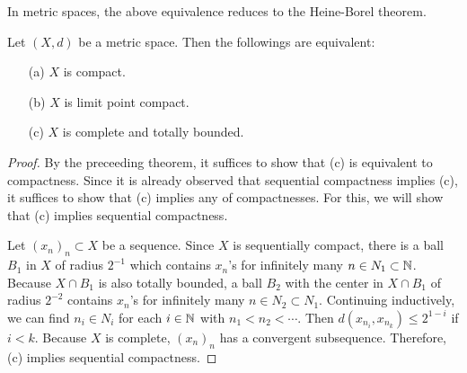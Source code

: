 In metric spaces, the above equivalence reduces to the Heine-Borel theorem.
\begin{thm}
    Let $(X, d)$ be a metric space.
    Then the followings are equivalent:
    \begin{enumerate}
        \item[(a)]
        {
            $X$ is compact.
        }
        \item[(b)]
        {
            $X$ is limit point compact.
        }
        \item[(c)]
        {
            $X$ is complete and totally bounded.
        }
    \end{enumerate}
\end{thm}
\begin{proof}
    By the preceeding theorem, it suffices to show that (c) is equivalent to compactness.
    Since it is already observed that sequential compactness implies (c), it suffices to show that (c) implies any of compactnesses.
    For this, we will show that (c) implies sequential compactness.

    Let $(x_n)_n\subset X$ be a sequence.
    Since $X$ is sequentially compact, there is a ball $B_1$ in $X$ of radius $2^{-1}$ which contains $x_n$'s for infinitely many $n\in N_1\subset{\mathbb{N}}$.
    Because $X\cap B_1$ is also totally bounded, a ball $B_2$ with the center in $X\cap B_1$ of radius $2^{-2}$ contains $x_n$'s for infinitely many $n\in N_2\subset N_1$.
    Continuing inductively, we can find $n_i\in N_i$ for each $i\in{\mathbb{N}}$ with $n_1<n_2<\cdots$.
    Then $d(x_{n_i}, x_{n_k})\leq 2^{1-i}$ if $i<k$.
    Because $X$ is complete, $(x_n)_n$ has a convergent subsequence.
    Therefore, (c) implies sequential compactness.
\end{proof}